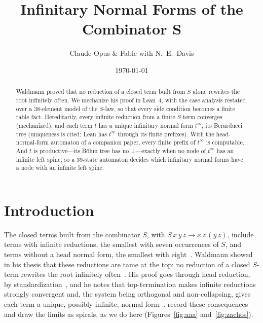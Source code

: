 \documentclass[11pt]{amsart}
\title{Infinitary Normal Forms of the Combinator $\bm{S}$}
\author{Claude Opus \& Fable with N.\ E.\ Davis}
\date{\today}
\theoremstyle{definition}
\theoremstyle{remark}
\begin{document}
\begin{abstract}
Waldmann proved that no reduction of a closed term built from $S$ alone rewrites the root
infinitely often. We mechanize his proof in Lean~4, with the case analysis restated over a
38-element model of the $S$-law, so that every side condition becomes a finite table fact.
Hereditarily, every infinite reduction from a finite $S$-term converges (mechanized), and each
term $t$ has a unique infinitary normal form $t^\infty$, its Berarducci tree (uniqueness is
cited; Lean has $t^\infty$ through its finite prefixes). With the
head-normal-form automaton of a companion paper, every finite prefix of $t^\infty$ is
computable. And $t$ is productive---its B\"ohm tree has no $\bot$---exactly when no node of
$t^\infty$ has an infinite left spine; so a 39-state automaton decides which infinitary normal forms have
a node with an infinite left spine.
\end{abstract}

\maketitle

\section{Introduction}\label{sec:intro}

The closed terms built from the combinator $S$, with $S\,x\,y\,z\to x\,z\,(y\,z)$, include
terms with infinite reductions, the smallest with seven occurrences of $S$, and terms without a
head normal form, the smallest with eight~\citep{dots}.
Waldmann showed in his thesis that these reductions are tame at the top: no reduction of a
closed $S$-term rewrites the root infinitely often~\citep[ch.~7]{waldmann-thesis}. His proof
goes through head reduction, by standardization~\citep[\S7.1]{waldmann-thesis}, and he notes
that top-termination makes infinite reductions strongly convergent and, the system being
orthogonal and non-collapsing, gives each term a unique, possibly infinite, normal
form~\citep[\S7.6]{waldmann-thesis}. \citet[Thm.~29 and App.~A.5]{dots} record these
consequences and draw the limits as spirals, as we do here
(Figures~\ref{fig:aaa} and~\ref{fig:zachos}).
\end{document}

